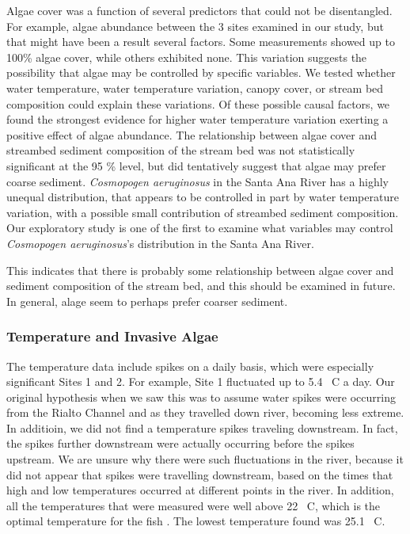 \documentclass{article}\usepackage[]{graphicx}\usepackage[]{color}
\begin{document}
Algae cover was a function of several predictors that could not be disentangled. For example, algae abundance between the 3 sites examined in our study, but that might have been a result several factors. Some measurements showed up to 100\% algae cover, while others exhibited none. This variation suggests the possibility that algae may be controlled by specific variables. We tested whether water temperature, water temperature variation, canopy cover, or stream bed composition could explain these variations. Of these possible causal factors, we found the strongest evidence for higher water temperature variation exerting a positive effect of algae abundance. The relationship between algae cover and streambed sediment composition of the stream bed was not statistically significant at the 95 \% level, but did tentatively suggest that algae may prefer coarse sediment. \emph{Cosmopogen aeruginosus} in the Santa Ana River has a highly unequal distribution, that appears to be controlled in part by water temperature variation, with a possible small contribution of streambed sediment composition. Our exploratory study is one of the first to examine what variables may control \emph{Cosmopogen aeruginosus}'s distribution in the Santa Ana River. 

This indicates that there is probably some relationship between algae cover and sediment composition of the stream bed, and this should be examined in future. In general, alage seem to perhaps prefer coarser sediment. 

\subsubsection{Temperature and Invasive Algae}

The temperature data include spikes on a daily basis, which were especially significant Sites 1 and 2. For example, Site 1 fluctuated up to 5.4 \textdegree~C a day. Our original hypothesis when we saw this was to assume water spikes were occurring from the Rialto Channel and as they travelled down river, becoming less extreme. In additioin, we did not find a temperature spikes traveling downstream. In fact, the spikes further downstream were actually occurring before the spikes upstream. We are unsure why there were such fluctuations in the river, because it did not appear that spikes were travelling downstream, based on the times that high and low temperatures occurred at different points in the river. In addition, all the temperatures that were measured were well above 22 \textdegree~C, which is the optimal temperature for the fish \citep{usfishandwildlifeservice14}. The lowest temperature found was 25.1 \textdegree~C. 
\end{document}
